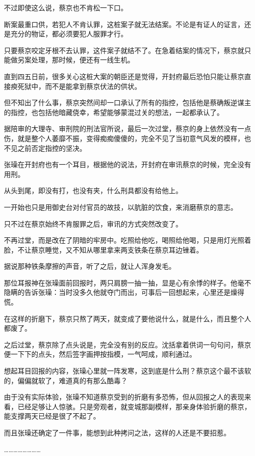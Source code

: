 不过即使这么说，蔡京也不肯松一下口。

断案最重口供，若犯人不肯认罪，这桩案子就无法结案。不论是有证人的证言，还是充分的物证，都必须要犯人服罪才行。

只要蔡京咬定牙根不去认罪，这件案子就结不了。在急着结案的情况下，蔡京就只能做另案处理，那时候，便还有一线生机。

直到四五日前，很多关心这桩大案的朝臣还是觉得，开封府最后恐怕只能让蔡京直接瘐死狱中，而不是能拿到蔡京伏法的供状。

但不知出了什么事，蔡京突然间却一口承认了所有的指控，包括他是蔡确叛逆谋主的指控，也包括他暗藏侥幸，希望能够蒙混过关的想法，一起都承认了。

据陪审的大理寺、审刑院的刑法官所说，最后一次过堂，蔡京的身上依然没有一点伤，就是整个人萎靡不振，变得痴痴傻傻的，完全不见了当初意气风发的模样，也不见之前否定指控的坚决。

张璪在开封府也有一个耳目，根据他的说法，开封府在审讯蔡京的时候，完全没有用刑。

从头到尾，即没有打，也没有夹，什么刑具都没有给他上。

一开始也只是用御史台对付官员的故技，以肮脏的饮食，来消磨蔡京的意志。

只不过在蔡京始终不肯服罪之后，审讯的方式突然改变了。

不再过堂，而是改在了阴暗的牢房中。吃照给他吃，喝照给他喝，只是用灯光照着脸，不让蔡京睡觉，又不知从哪里拿来两支铁条在蔡京耳边锉着。

据说那种铁条摩擦的声音，听了之后，就让人浑身发毛。

那位耳报神在张璪面前回报时，两只肩膀一抽一抽，显是心有余悸的样子。他毫不隐瞒的告诉张璪：当时没多久他就夺门而出，可事后一回想起来，心里还是燥得慌。

在这样的折磨下，蔡京只熬了两天，就变成了要他说什么，就是什么，而且整个人都废了。

之后过堂，蔡京除了点头说是，完全没有别的反应。沈括拿着供词一句句问，蔡京便一下下的点头，然后签字画押按指模，一气呵成，顺利通过。

想起耳目回报的内容，张璪心里就一阵发寒，这到底是什么刑？蔡京这个最不该软的，偏偏就软了，难道真的有那么酷毒？

由于没有实际体验，张璪不知道蔡京受到的折磨有多恐怖，但从回报之人的表现来看，已经足够让人惊骇。只是旁观者，就变城那副模样，那亲身体验折磨的蔡京，能支撑两天已经是很了不起了。

而且张璪还确定了一件事，能想到此种拷问之法，这样的人还是不要招惹。

……………………

